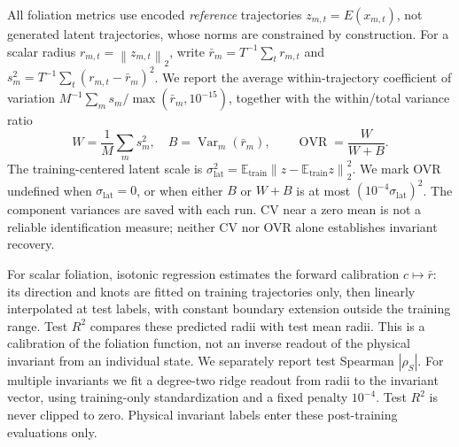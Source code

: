 \documentclass[10pt]{article}
\theoremstyle{definition}
\theoremstyle{remark}
\newcommand{\norm}[1]{\left\lVert #1 \right\rVert}
\DeclareMathOperator{\Var}{Var}
\DeclareMathOperator{\OVR}{OVR}
\begin{document}
All foliation metrics use encoded \emph{reference} trajectories $z_{m,t}=E(x_{m,t})$, not generated latent trajectories, whose norms are constrained by construction. For a scalar radius $r_{m,t}=\norm{z_{m,t}}_2$, write $\bar r_m=T^{-1}\sum_t r_{m,t}$ and $s_m^2=T^{-1}\sum_t(r_{m,t}-\bar r_m)^2$. We report the average within-trajectory coefficient of variation $M^{-1}\sum_m s_m/\max(\bar r_m,10^{-15})$, together with the within/total variance ratio
\begin{equation}
 W=\frac1M\sum_m s_m^2,\quad B=\Var_m(\bar r_m),\qquad
 \OVR=\frac{W}{W+B}.
 \label{eq:ovr_def}
\end{equation}
The training-centered latent scale is $\sigma_{\mathrm{lat}}^2=\mathbb E_{\mathrm{train}}\norm{z-\mathbb E_{\mathrm{train}}z}_2^2$. We mark OVR undefined when $\sigma_{\mathrm{lat}}=0$, or when either $B$ or $W+B$ is at most $(10^{-4}\sigma_{\mathrm{lat}})^2$. The component variances are saved with each run. CV near a zero mean is not a reliable identification measure; neither CV nor OVR alone establishes invariant recovery.

For scalar foliation, isotonic regression estimates the forward calibration $c\mapsto\bar r$: its direction and knots are fitted on training trajectories only, then linearly interpolated at test labels, with constant boundary extension outside the training range. Test $R^2$ compares these predicted radii with test mean radii. This is a calibration of the foliation function, not an inverse readout of the physical invariant from an individual state. We separately report test Spearman $|\rho_S|$. For multiple invariants we fit a degree-two ridge readout from radii to the invariant vector, using training-only standardization and a fixed penalty $10^{-4}$. Test $R^2$ is never clipped to zero. Physical invariant labels enter these post-training evaluations only.

\begin{table}[t]
\centering
\caption{Lotka--Volterra evaluation on 16 held-out trajectories. All models predict over the same physical horizon $1.8$, with five-seed mean $\pm$ sample SD. Calib.\ $R^2$ predicts mean radius from the invariant using a training-fitted isotonic map. The projected-invariant baseline learns a scalar with an arbitrary offset; its CV is omitted because that gauge is not comparable to an encoder norm. Its OVR and calibration use that learned scalar.}
\label{tab:lv_results}
\resizebox{\textwidth}{!}{}
\end{table}
\end{document}
